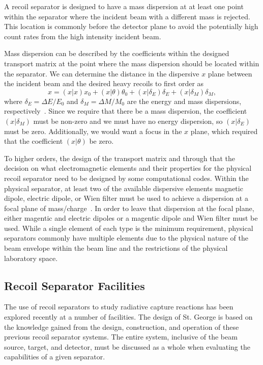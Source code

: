 A recoil separator is designed to have a mass dispersion at at least one point
within the separator where the incident beam with a different mass is rejected.
This location is commonly before the detector plane to avoid the potentially
high count rates from the high intensity incident beam.

Mass dispersion can be described by the coefficients within the designed
transport matrix at the point where the mass dispersion should be located
within the separator. We can determine the distance in the dispersive $x$ plane
between the incident beam and the desired heavy recoils to first order as
\[
    x = (x|x)x_0 + (x|\theta)\theta_0 + (x|\delta_E)\delta_E + (x|\delta_M)\delta_M,
\]
where $\delta_E = \Delta E/E_0$ and $\delta_M = \Delta M/M_0$ are the energy
and mass dispersions, respectively~\cite{Davids2003}. Since we require that
there be a mass dispersion, the coefficient $(x|\delta_M)$ must be non-zero and
we must have no energy dispersion, so $(x|\delta_E)$ must be zero.
Additionally, we would want a focus in the $x$ plane, which required that the
coefficient $(x|\theta)$ be zero.

To higher orders, the design of the transport matrix and through that the
decision on what electromagnetic elements and their properties for the physical
recoil separator need to be designed by some computational codes. Within the
physical separator, at least two of the available dispersive elements magnetic
dipole, electric dipole, or Wien filter must be used to achieve a dispersion at
a focal plane of mass/charge~\cite{Davids2003}. In order to leave that
dispersion at the focal plane, either magentic and electric dipoles or a
magentic dipole and Wien filter must be used. While a single element of each
type is the minimum requirement, physical separators commonly have multiple
elements due to the physical nature of the beam envelope within the beam line
and the restrictions of the physical laboratory space.


\subsection{Recoil Separator Facilities}

The use of recoil separators to study radiative capture reactions has been
explored recently at a number of facilities. The design of St. George is based
on the knowledge gained from the design, construction, and operation of these
previous recoil separator systems. The entire system, inclusive of the beam
source, target, and detector, must be discussed as a whole when evaluating the
capabilities of a given separator.

